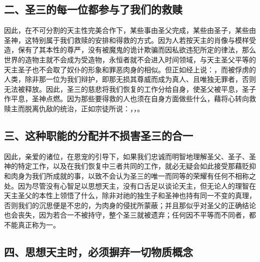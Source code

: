 
\subsection{二、圣三的每一位都参与了我们的救赎}

因此，在不可分割的天主性完美合作下，某些事由圣父完成，某些由圣子，某些由圣神，这特别属于我们救赎的安排和得救的方式。因为人若按天主的肖像与模样受造，保有了其本性的尊严，没有被魔鬼的诡计欺骗而因私欲违犯所定的律法，那么世界的造物主就不会成为受造物，永恒者就不会进入时间领域，与天主圣父平等的天主圣子也不会取了奴仆的形象和罪恶肉身的相似。但正如经上说：，而被俘虏的人类，除非那一位为我们辩护，即那无损其尊威而成为真人、且唯独无罪者，否则无法被释放。因此，圣三的慈悲将我们恢复的工作分给自身，使圣父被平息，圣子作平息，圣神点燃。因为那些要得救的人也须在自身方面做些什么，藉将心转向救赎主而脱离仇敌的统治，正如宗徒所说：，，。\par


\subsection{三、这种职能的分配并不损害圣三的合一}

因此，亲爱的诸位，在恩宠的引导下，如果我们忠诚而明智地理解圣父、圣子、圣神的特定工作，以及在我们恢复中三者共同的工作，就必无疑会如此接受那藉贬抑和肉身为我们所成就的事，以致不会认为圣三的唯一而同等的荣耀有任何不相称之处。因为尽管没有心智足以思想天主，没有口舌足以谈论天主，但无论人的理智在天主圣父的本性上领悟了什么，除非对祂的独生子和圣神也持有同一不变的真理，否则我们的沉思便是不忠的，为肉身的侵扰所蒙蔽；并且那似乎对圣父的正确结论也会丧失，因为若合一不被持守，整个圣三就被遗弃；任何因不平等而不同者，都不能真正称为一。\par


\subsection{四、思想天主时，必须摒弃一切物质概念}

